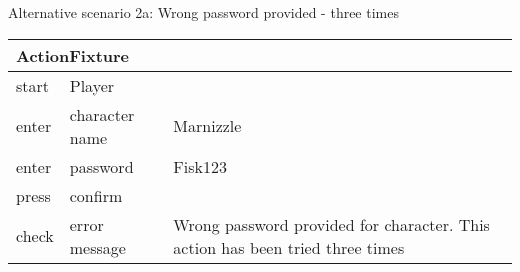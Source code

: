 \noindent Alternative scenario 2a: Wrong password provided - three times

\vspace{0.4cm}
\begin{tabular}{| p{2cm} | p{5.5cm} | p{5.5cm} |} \hline
\multicolumn{3}{|l|}{ActionFixture} \\ \hline
start & Player &  \\ \hline
enter & character name & Marnizzle \\ \hline
enter & password & Fisk123 \\ \hline
press & confirm &  \\ \hline
check & error message & Wrong password provided for character. This action has been tried three times \\ \hline
\end{tabular}
\vspace{0.8cm}
